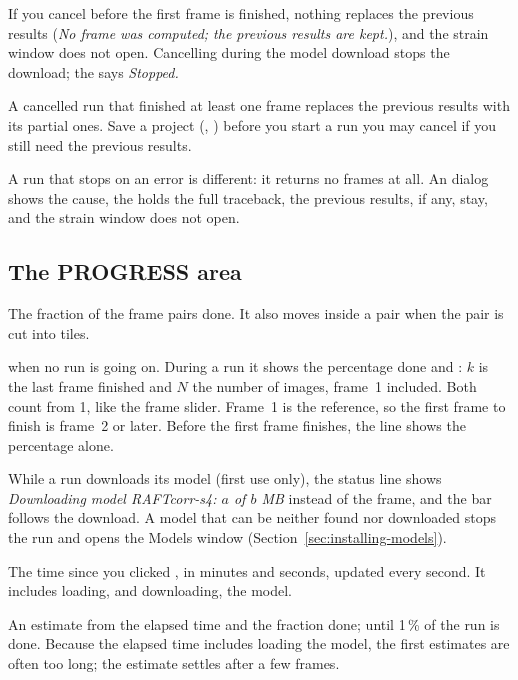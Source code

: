 If you cancel before the first frame is finished, nothing replaces the previous results
(\emph{No frame was computed; the previous results are kept.}), and the strain window does not
open. Cancelling during the model
download stops the download; the  says \emph{Stopped.}

\begin{warnbox}
A cancelled run that finished at least one frame replaces the previous results with its partial
ones. Save a project (, ) before you start a run you may
cancel if you still need the previous results.
\end{warnbox}

A run that stops on an error is different: it returns no frames at all. An 
dialog shows the cause, the  holds the full traceback, the previous results, if any,
stay, and the strain window does not open.

\subsection{The PROGRESS area}

\begin{description}[leftmargin=1.2cm,style=nextline]
  \item[Progress bar]
    The fraction of the frame pairs done. It also moves inside a pair when the pair is cut into
    tiles.
  \item[Status line]
     when no run is going on. During a run it shows the percentage done and
    : $k$ is the last frame finished and $N$ the number of images, frame~1
    included. Both count from 1, like the frame slider. Frame~1 is the reference, so the first
    frame to finish is frame~2 or later. Before the first frame finishes, the line shows the
    percentage alone.
  \item[Model download]
    While a run downloads its model (first use only), the status line shows \emph{Downloading
    model RAFTcorr-s4: $a$ of $b$ MB} instead of the frame, and the bar follows the download. A
    model that can be neither found nor downloaded stops the run and opens the Models window
    (Section~\ref{sec:installing-models}).
  \item[ELAPSED]
    The time since you clicked , in minutes and seconds, updated every
    second. It includes loading, and downloading, the model.
  \item[REMAINING]
    An estimate from the elapsed time and the fraction done; \ui{-{}-:-{}-} until 1\,\% of the
    run is done. Because the elapsed time includes loading the model, the first estimates are
    often too long; the estimate settles after a few frames.
\end{description}

